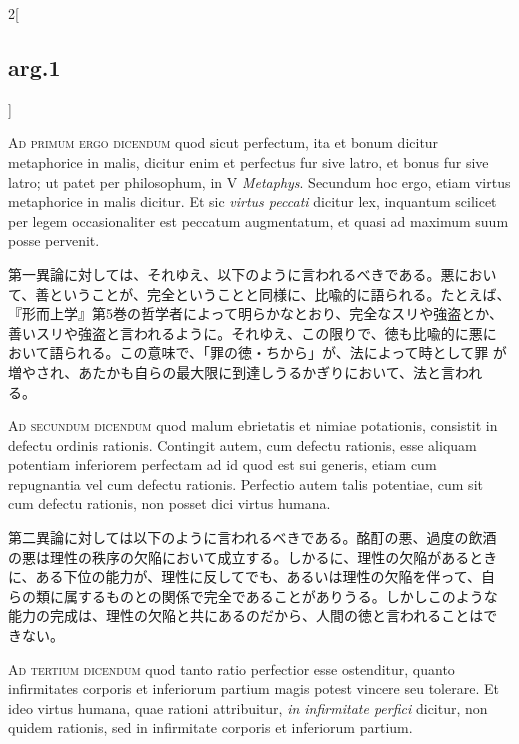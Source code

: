 \documentclass[paper=a4paper,fontsize=10pt,jafontsize=9pt,titlepage]{jlreq}
\begin{document}
\begin{paracol}{2}[\subsection{arg.1}]
\switchcolumn*[\subsection{ad.1}]

{\scshape Ad primum ergo dicendum} quod sicut perfectum, ita et bonum
dicitur metaphorice in malis, dicitur enim et perfectus fur sive
latro, et bonus fur sive latro; ut patet per philosophum, in V
{\itshape Metaphys}. Secundum hoc ergo, etiam virtus metaphorice in
malis dicitur. Et sic {\itshape virtus peccati} dicitur lex, inquantum
scilicet per legem occasionaliter est peccatum augmentatum, et quasi
ad maximum suum posse pervenit.

\switchcolumn

第一異論に対しては、それゆえ、以下のように言われるべきである。悪におい
て、善ということが、完全ということと同様に、比喩的に語られる。たとえば、
『形而上学』第5巻の哲学者によって明らかなとおり、完全なスリや強盗とか、
善いスリや強盗と言われるように。それゆえ、この限りで、徳も比喩的に悪に
おいて語られる。この意味で、「罪の徳・ちから」が、法によって時として罪
が増やされ、あたかも自らの最大限に到達しうるかぎりにおいて、法と言われ
る。

\switchcolumn*[\subsection{ad.2}]

{\scshape Ad secundum dicendum} quod malum ebrietatis et nimiae
potationis, consistit in defectu ordinis rationis. Contingit autem,
cum defectu rationis, esse aliquam potentiam inferiorem perfectam ad
id quod est sui generis, etiam cum repugnantia vel cum defectu
rationis. Perfectio autem talis potentiae, cum sit cum defectu
rationis, non posset dici virtus humana.

\switchcolumn

第二異論に対しては以下のように言われるべきである。酩酊の悪、過度の飲酒
の悪は理性の秩序の欠陥において成立する。しかるに、理性の欠陥があるとき
に、ある下位の能力が、理性に反してでも、あるいは理性の欠陥を伴って、自
らの類に属するものとの関係で完全であることがありうる。しかしこのような
能力の完成は、理性の欠陥と共にあるのだから、人間の徳と言われることはで
きない。

\switchcolumn*[\subsection{ad.3}]

{\scshape Ad tertium dicendum} quod tanto ratio perfectior esse
ostenditur, quanto infirmitates corporis et inferiorum partium magis
potest vincere seu tolerare. Et ideo virtus humana, quae rationi
attribuitur, {\itshape in infirmitate perfici} dicitur, non quidem
rationis, sed in infirmitate corporis et inferiorum partium.


\end{paracol}
\end{document}
